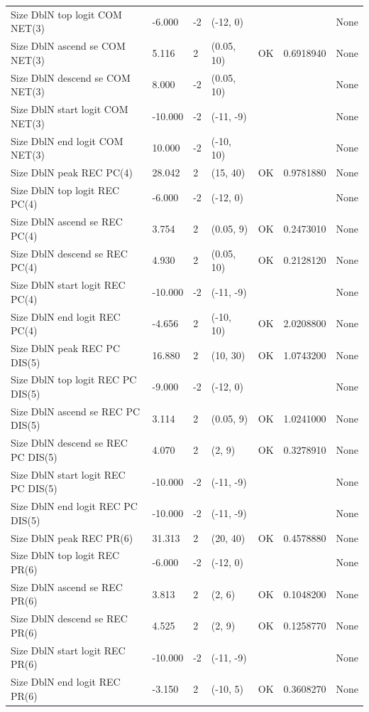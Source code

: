 \documentclass[11pt,
  english,
  a4paper,
]{article}
\begin{document}
\begin{landscape}
\begin{longtable}[t]{>{\raggedright\arraybackslash}p{8.5cm}lllll>{\raggedright\arraybackslash}p{4cm}}
Size DblN top logit COM NET(3) & -6.000 & -2 & (-12, 0) &  &  & None\\
Size DblN ascend se COM NET(3) & 5.116 & 2 & (0.05, 10) & OK & 0.6918940 & None\\
Size DblN descend se COM NET(3) & 8.000 & -2 & (0.05, 10) &  &  & None\\
Size DblN start logit COM NET(3) & -10.000 & -2 & (-11, -9) &  &  & None\\
Size DblN end logit COM NET(3) & 10.000 & -2 & (-10, 10) &  &  & None\\
Size DblN peak REC PC(4) & 28.042 & 2 & (15, 40) & OK & 0.9781880 & None\\
Size DblN top logit REC PC(4) & -6.000 & -2 & (-12, 0) &  &  & None\\
Size DblN ascend se REC PC(4) & 3.754 & 2 & (0.05, 9) & OK & 0.2473010 & None\\
Size DblN descend se REC PC(4) & 4.930 & 2 & (0.05, 10) & OK & 0.2128120 & None\\
Size DblN start logit REC PC(4) & -10.000 & -2 & (-11, -9) &  &  & None\\
Size DblN end logit REC PC(4) & -4.656 & 2 & (-10, 10) & OK & 2.0208800 & None\\
Size DblN peak REC PC DIS(5) & 16.880 & 2 & (10, 30) & OK & 1.0743200 & None\\
Size DblN top logit REC PC DIS(5) & -9.000 & -2 & (-12, 0) &  &  & None\\
Size DblN ascend se REC PC DIS(5) & 3.114 & 2 & (0.05, 9) & OK & 1.0241000 & None\\
Size DblN descend se REC PC DIS(5) & 4.070 & 2 & (2, 9) & OK & 0.3278910 & None\\
Size DblN start logit REC PC DIS(5) & -10.000 & -2 & (-11, -9) &  &  & None\\
Size DblN end logit REC PC DIS(5) & -10.000 & -2 & (-11, -9) &  &  & None\\
Size DblN peak REC PR(6) & 31.313 & 2 & (20, 40) & OK & 0.4578880 & None\\
Size DblN top logit REC PR(6) & -6.000 & -2 & (-12, 0) &  &  & None\\
Size DblN ascend se REC PR(6) & 3.813 & 2 & (2, 6) & OK & 0.1048200 & None\\
Size DblN descend se REC PR(6) & 4.525 & 2 & (2, 9) & OK & 0.1258770 & None\\
Size DblN start logit REC PR(6) & -10.000 & -2 & (-11, -9) &  &  & None\\
Size DblN end logit REC PR(6) & -3.150 & 2 & (-10, 5) & OK & 0.3608270 & None\\

\end{longtable}
\end{landscape}
\end{document}

